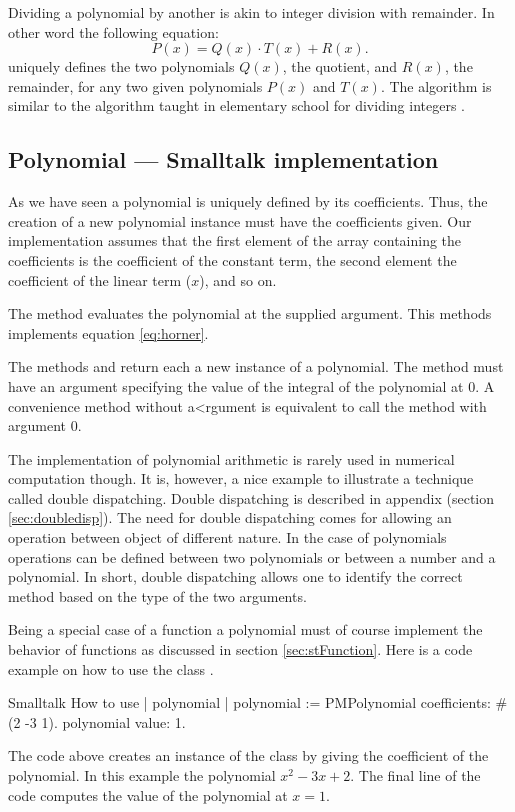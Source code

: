 Dividing a polynomial by another is akin to integer division with
remainder. In other word the following equation:
\begin{equation}
P\left(x\right)=Q\left(x\right)\cdot
T\left(x\right)+R\left(x\right).
\end{equation}
uniquely defines the two polynomials $Q\left(x\right)$, the
quotient, and $R\left(x\right)$, the remainder, for any two given
polynomials $P\left(x\right)$ and $T\left(x\right)$. The algorithm
is similar to the algorithm taught in elementary school for
dividing integers \cite{Knuth2}.

\subsection{Polynomial --- Smalltalk implementation}
As we have seen a polynomial is uniquely defined by its
coefficients. Thus, the creation of a new polynomial instance must
have the coefficients given. Our implementation assumes that the
first element of the array containing the coefficients is the
coefficient of the constant term, the second element the
coefficient of the linear term ($x$), and so on.

The method  evaluates the polynomial at the supplied
argument. This methods implements equation \ref{eq:horner}.

The methods  and  return each a new
instance of a polynomial. The method  must have an
argument specifying the value of the integral of the polynomial at
0. A convenience  method without a<rgument is
equivalent to call the method  with argument 0.

The implementation of polynomial arithmetic is rarely used in
numerical computation though. It is, however, a nice example to
illustrate a technique called double dispatching. Double
dispatching is described in appendix (\cf section
\ref{sec:doubledisp}). The need for double dispatching comes for
allowing an operation between object of different nature. In the
case of polynomials operations can be defined between two
polynomials or between a number and a polynomial. In short, double
dispatching allows one to identify the correct method based on the
type of the two arguments.

Being a special case of a function a polynomial must of course implement the behavior of
functions as discussed in section \ref{sec:stFunction}.
Here is a code example on how to use the class .
\begin{listing}{Smalltalk}
{How to use }
| polynomial |
polynomial := PMPolynomial coefficients: #(2 -3 1).
polynomial value: 1.
\end{listing}
The code above creates an instance of the class  by giving the coefficient of the polynomial. In
this example the polynomial $x^2-3x+2$. The final line of the code
computes the value of the polynomial at $x=1$.

